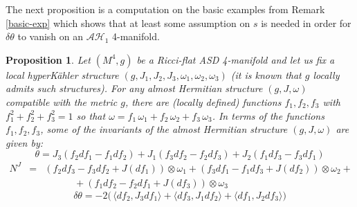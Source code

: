 \documentclass{amsart}
\newtheorem{prop}[theorem]{Proposition}
\begin{document}
\noindent The next proposition is a computation on the basic examples from Remark \ref{basic-exp} which shows that at least some assumption on $s$ is needed in order for $\delta \theta $ to vanish on an $\mathcal{AH}_1$ 4-manifold.




\begin{prop} \label{basic-exp-comp}
Let $(M^4, g)$ be a Ricci-flat ASD 4-manifold and let us fix a local hyperK\"ahler structure $(g, J_1, J_2, J_3, \omega_1, \omega_2, \omega_3)$ (it is known that $g$ locally admits such structures).
 For any almost Hermitian structure $(g,J,\omega)$ compatible with the metric $g$, there are (locally defined) functions $f_1, f_2, f_3$ with $f_1^2 + f_2^2 + f_3^2 = 1$ so that $\omega = f_1 \, \omega_1 + f_2 \, \omega_2 + f_3 \,  \omega_3$. In terms of the functions $f_1, f_2, f_3$, some of the invariants of the almost Hermitian structure $(g,J,\omega)$ are given by:
\begin{equation} \label{theta-T4-exp}
\theta = J_3(f_2 df_1 - f_1 df_2) + J_1 (f_3 df_2 - f_2 df_3) +J_2(f_1df_3 -f_3 df_1) 
\end{equation}
\begin{eqnarray} \label{N-T4-exp}
N^J &=& (f_2 df_3 - f_3 df_2 +J(df_1)) \otimes \omega_1 + (f_3 df_1 - f_1 df_3 +J(df_2)) \otimes \omega_2 + \\ \nonumber & & \; \; \; \; \; \; \; \; \; \; \; + (f_1 df_2 - f_2 df_1 +J(df_3)) \otimes \omega_3
\end{eqnarray}
\begin{equation} \label{deltheta-T4-exp}
\delta \theta = -2\big( \, \langle df_2, J_3 df_1 \rangle + \langle df_3, J_1 df_2 \rangle + \langle df_1, J_2 df_3 \rangle \big)
\end{equation}
\end{prop}
\end{document}
